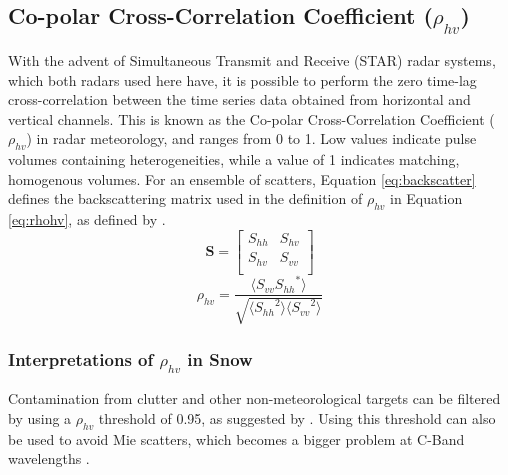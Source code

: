 \subsection{Co-polar Cross-Correlation Coefficient ($\rho_{hv}$)}
With the advent of Simultaneous Transmit and Receive (STAR) radar systems, which both radars used here have, it is possible to perform the zero time-lag
cross-correlation between the time series data obtained from horizontal and vertical channels. This is known as the Co-polar Cross-Correlation Coefficient
($\rho_{hv}$) in radar meteorology, and ranges from 0 to 1. Low values indicate pulse volumes containing heterogeneities, while a value of 1 indicates
matching, homogenous volumes. For an ensemble of scatters, Equation \ref{eq:backscatter} defines the backscattering matrix used in the definition of
$\rho_{hv}$ in Equation \ref{eq:rhohv}, as defined by \citet{Ryzhkov2007b}.
\begin{equation}\label{eq:backscatter}
\mathbf{S} = \begin{bmatrix}
             S_{hh}       & S_{hv} \\
             S_{hv}       & S_{vv} \\
             \end{bmatrix}
\end{equation}
\begin{equation}\label{eq:rhohv}
\rho_{hv} = \frac{\langle{S_{vv}{S_{hh}}^{*}\rangle}}{\sqrt{\langle{{S_{hh}}^{2}\rangle}\langle{{S_{vv}}^{2}\rangle}}}
\end{equation}
\subsubsection{Interpretations of $\rho_{hv}$ in Snow}
Contamination from clutter and other non-meteorological targets can be filtered by using a $\rho_{hv}$ threshold of 0.95, as suggested by \citet{Straka2000}.
Using this threshold can also be used to avoid Mie scatters, which becomes a bigger problem at C-Band wavelengths \citet{Fabry2015}.
 



